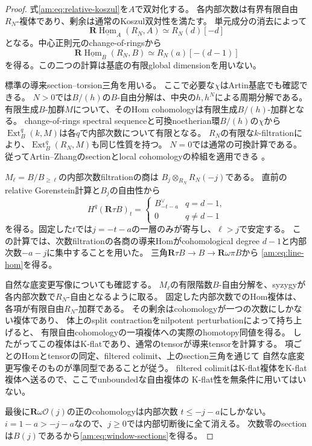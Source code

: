 \begin{proof}
式\eqref{am:eq:relative-koszul}を$A$で双対化する。
各内部次数は有界有限自由$R_N$-複体であり、剰余は通常のKoszul双対性を満たす。
単元成分の消去によって
\[
 \mathbf R\underline{\operatorname{Hom}}_A(R_N,A)
 \simeq R_N(d)[-d]
\]
となる。中心正則元のchange-of-ringsから
\[
 \mathbf R\underline{\operatorname{Hom}}_B(R_N,B)
 \simeq R_N(a)[-(d-1)]
\]
を得る。この二つの計算は基底の有限global dimensionを用いない。

標準の導来section--torsion三角を用いる。
ここで必要な$\chi$はArtin基底でも確認できる。
$N>0$では$B/(h)$の$B$-自由分解は、中央の$h,h^N$による周期分解である。
有限生成$B$-加群$M$について、そのHom cohomologyは有限生成$B/(h)$-加群となる。
change-of-rings spectral sequenceと可換noetherian環$B/(h)$の$\chi$から
$\operatorname{Ext}_B^q(k,M)$は各$q$で内部次数について有限となる。
$R_N$の有限な$k$-filtrationにより、$\operatorname{Ext}_B^q(R_N,M)$も同じ性質を持つ。
$N=0$では通常の可換計算である。
従ってArtin--Zhangのsectionとlocal cohomologyの枠組を適用できる
\cite{LP-AZ}。

$M_\ell=B/B_{\ge\ell}$の内部次数filtrationの商は
$B_j\otimes_{R_N}R_N(-j)$である。
直前のrelative Gorenstein計算と$B_j$の自由性から
\[
 H^q(\mathbf R\tau B)_t=
 \begin{cases}
 B_{-t-a}^{\vee}&q=d-1,\\
 0&q\ne d-1
 \end{cases}
\]
を得る。固定した$t$では$j=-t-a$の一層のみが寄与し、$\ell>j$で安定する。
この計算では、次数filtrationの各商の導来Homがcohomological degree
$d-1$と内部次数$-a-j$に集中することを用いた。
三角$\mathbf R\tau B\to B\to\mathbf R\omega\pi B$から
\eqref{am:eq:line-hom}を得る。

自然な底変更写像についても確認する。
$M_\ell$の有限階数$B$-自由分解を、syzygyが各内部次数で$R_N$-自由となるように取る。
固定した内部次数でのHom複体は、各項が有限自由$R_N$-加群である。
その剰余はcohomologyが一つの次数にしかない複体であり、
体上のsplit contractionをnilpotent perturbationによって持ち上げると、
有限自由cohomologyの一項複体への実際のhomotopy同値を得る。
したがってこの複体はK-flatであり、通常のtensorが導来tensorを計算する。
項ごとのHomとtensorの同定、filtered colimit、上のsection三角を通じて
自然な底変更写像そのものが準同型であることが従う。
filtered colimitはK-flat複体をK-flat複体へ送るので、ここでunboundedな自由複体の
K-flat性を無条件に用いてはいない。

最後に$\mathbf R\omega\mathcal O(j)$の正のcohomologyは内部次数
$t\le-j-a$にしかない。
$i=1-a>-j-a$なので、$j\ge0$では内部切断後に全て消える。
次数零のsectionは$B(j)$であるから\eqref{am:eq:window-sections}を得る。
\end{proof}

